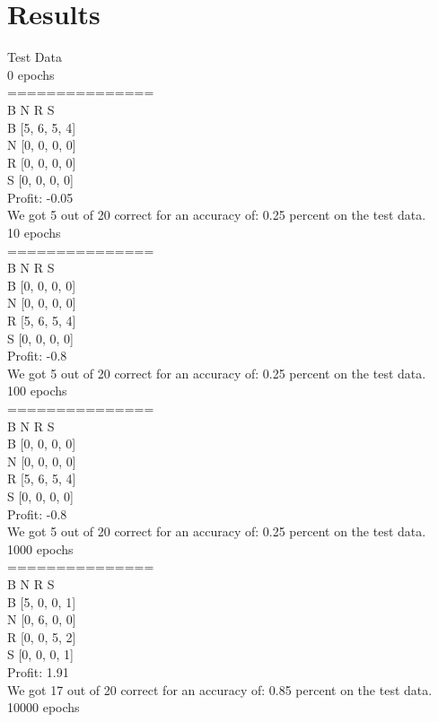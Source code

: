 \documentclass{book}
\begin{document}
\section*{Results}
Test Data
\\
0 epochs
\\
===============
\\
   B  N  R  S
\\
B [5, 6, 5, 4]
\\
N [0, 0, 0, 0]
\\
R [0, 0, 0, 0]
\\
S [0, 0, 0, 0]
\\
Profit: -0.05
\\
We got 5 out of 20 correct for an accuracy of: 0.25 percent on the test data.
\\
10 epochs
\\
===============
\\
   B  N  R  S
\\
B [0, 0, 0, 0]
\\
N [0, 0, 0, 0]
\\
R [5, 6, 5, 4]
\\
S [0, 0, 0, 0]
\\
Profit: -0.8
\\
We got 5 out of 20 correct for an accuracy of: 0.25 percent on the test data.
\\
100 epochs
\\
===============
\\
   B  N  R  S
\\
B [0, 0, 0, 0]
\\
N [0, 0, 0, 0]
\\
R [5, 6, 5, 4]
\\
S [0, 0, 0, 0]
\\
Profit: -0.8
\\
We got 5 out of 20 correct for an accuracy of: 0.25 percent on the test data.
\\
1000 epochs
\\
===============
\\
   B  N  R  S
\\
B [5, 0, 0, 1]
\\
N [0, 6, 0, 0]
\\
R [0, 0, 5, 2]
\\
S [0, 0, 0, 1]
\\
Profit: 1.91
\\
We got 17 out of 20 correct for an accuracy of: 0.85 percent on the test data.
\\
10000 epochs
\\
\end{document}
